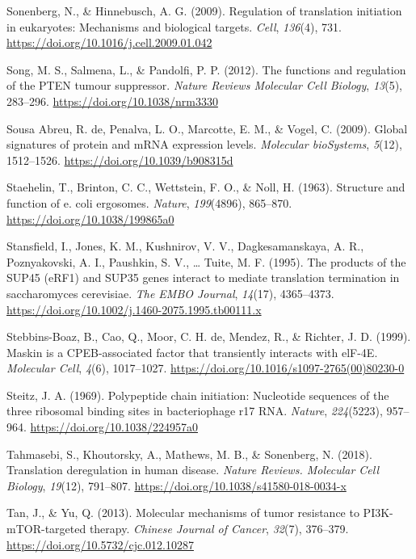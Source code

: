 \documentclass[12pt,openany]{book}
\begin{document}
\hypertarget{ref-Sonenberg2009}{}
Sonenberg, N., \& Hinnebusch, A. G. (2009). Regulation of translation
initiation in eukaryotes: Mechanisms and biological targets.
\emph{Cell}, \emph{136}(4), 731.
\url{https://doi.org/10.1016/j.cell.2009.01.042}

\hypertarget{ref-Song2012}{}
Song, M. S., Salmena, L., \& Pandolfi, P. P. (2012). The functions and
regulation of the PTEN tumour suppressor. \emph{Nature Reviews Molecular
Cell Biology}, \emph{13}(5), 283--296.
\url{https://doi.org/10.1038/nrm3330}

\hypertarget{ref-deSousaAbreu2009}{}
Sousa Abreu, R. de, Penalva, L. O., Marcotte, E. M., \& Vogel, C.
(2009). Global signatures of protein and mRNA expression levels.
\emph{Molecular bioSystems}, \emph{5}(12), 1512--1526.
\url{https://doi.org/10.1039/b908315d}

\hypertarget{ref-Staehelin1963}{}
Staehelin, T., Brinton, C. C., Wettstein, F. O., \& Noll, H. (1963).
Structure and function of e. coli ergosomes. \emph{Nature},
\emph{199}(4896), 865--870. \url{https://doi.org/10.1038/199865a0}

\hypertarget{ref-Stansfield1995}{}
Stansfield, I., Jones, K. M., Kushnirov, V. V., Dagkesamanskaya, A. R.,
Poznyakovski, A. I., Paushkin, S. V., \ldots{} Tuite, M. F. (1995). The
products of the SUP45 (eRF1) and SUP35 genes interact to mediate
translation termination in saccharomyces cerevisiae. \emph{The EMBO
Journal}, \emph{14}(17), 4365--4373.
\url{https://doi.org/10.1002/j.1460-2075.1995.tb00111.x}

\hypertarget{ref-Stebbins-Boaz1999}{}
Stebbins-Boaz, B., Cao, Q., Moor, C. H. de, Mendez, R., \& Richter, J.
D. (1999). Maskin is a CPEB-associated factor that transiently interacts
with elF-4E. \emph{Molecular Cell}, \emph{4}(6), 1017--1027.
\url{https://doi.org/10.1016/s1097-2765(00)80230-0}

\hypertarget{ref-Steitz1969}{}
Steitz, J. A. (1969). Polypeptide chain initiation: Nucleotide sequences
of the three ribosomal binding sites in bacteriophage r17 RNA.
\emph{Nature}, \emph{224}(5223), 957--964.
\url{https://doi.org/10.1038/224957a0}

\hypertarget{ref-Tahmasebi2018}{}
Tahmasebi, S., Khoutorsky, A., Mathews, M. B., \& Sonenberg, N. (2018).
Translation deregulation in human disease. \emph{Nature Reviews.
Molecular Cell Biology}, \emph{19}(12), 791--807.
\url{https://doi.org/10.1038/s41580-018-0034-x}

\hypertarget{ref-Tan2013}{}
Tan, J., \& Yu, Q. (2013). Molecular mechanisms of tumor resistance to
PI3K-mTOR-targeted therapy. \emph{Chinese Journal of Cancer},
\emph{32}(7), 376--379. \url{https://doi.org/10.5732/cjc.012.10287}
\end{document}
